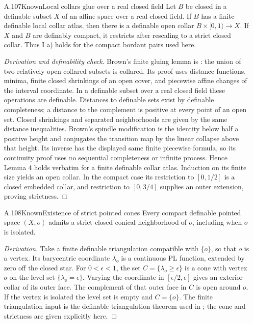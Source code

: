 \begin{saresult}{A.107}{Known}{Local collars glue over a real closed field}
Let $B$ be closed in a definable subset $X$ of an affine space over a
real closed field. If $B$ has a finite definable local collar atlas, then
there is a definable open collar $B\times[0,1)\to X$. If $X$ and $B$
are definably compact, it restricts after rescaling to a strict closed
collar. Thus I a) holds for the compact bordant pairs used here.
\end{saresult}
\begin{proof}[Derivation and definability check]
Brown's finite gluing lemma is \cite[Lemmas 1--4, pp.~333--337]{Brown1962}:
the union of two relatively open collared subsets is collared. Its proof
uses distance functions, minima, finite closed shrinkings of an open
cover, and piecewise affine changes of the interval coordinate. In a
definable subset over a real closed field these operations are definable.
Distances to definable sets exist by definable completeness; a distance
to the complement is positive at every point of an open set. Closed
shrinkings and separated neighborhoods are given by the same distance
inequalities. Brown's spindle modification is the identity below half
a positive height and conjugates the transition map by the linear
collapse above that height. Its inverse has the displayed same finite
piecewise formula, so its continuity proof uses no sequential
completeness or infinite process. Hence Lemma 4 holds verbatim for a
finite definable collar atlas. Induction on its finite size yields an
open collar. In the compact case its restriction to $[0,1/2]$ is a
closed embedded collar, and restriction to $[0,3/4]$ supplies an outer
extension, proving strictness.
\end{proof}

\begin{saresult}{A.108}{Known}{Existence of strict pointed cones}
Every compact definable pointed space $(X,o)$ admits a strict closed
conical neighborhood of $o$, including when $o$ is isolated.
\end{saresult}
\begin{proof}[Derivation]
Take a finite definable triangulation compatible with $\{o\}$, so that
$o$ is a vertex. Its barycentric coordinate $\lambda_o$ is a continuous
PL function, extended by zero off the closed star. For $0<\epsilon<1$,
the set $C=\{\lambda_o\ge\epsilon\}$ is a cone with vertex $o$ on the
level set $\{\lambda_o=\epsilon\}$. Varying the coordinate in
$[\epsilon/2,\epsilon]$ gives an exterior collar of its outer face.
The complement of that outer face in $C$ is open around $o$. If the
vertex is isolated the level set is empty and $C=\{o\}$. The finite
triangulation input is the definable triangulation theorem used in
\cite[\S1]{Shiota2010}; the cone and strictness are given explicitly here.
\end{proof}

